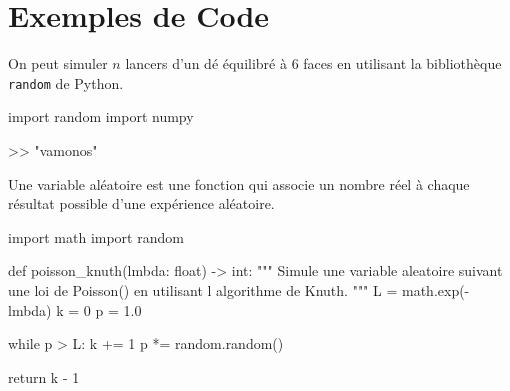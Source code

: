 \section{Exemples de Code}

\begin{examplebox}
On peut simuler $n$ lancers d'un dé équilibré à 6 faces en utilisant la bibliothèque \texttt{random} de Python.

\begin{codecell}
import random
import numpy
\end{codecell}

\begin{outputcell}
>> "vamonos"
\end{outputcell}

\end{examplebox}

\begin{definitionbox}
Une variable aléatoire est une fonction qui associe un nombre réel à chaque résultat possible d'une expérience aléatoire.
\end{definitionbox}

\begin{codecell}
import math
import random

def poisson_knuth(lmbda: float) -> int:
  """
  Simule une variable aleatoire suivant une loi de Poisson()
  en utilisant l algorithme de Knuth.
  """
  L = math.exp(-lmbda)
  k = 0
  p = 1.0

  while p > L:
  k += 1
  p *= random.random()

  return k - 1
\end{codecell}
